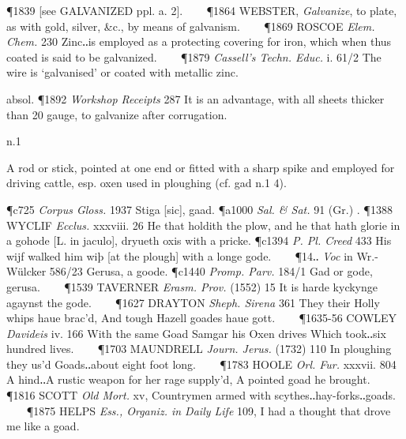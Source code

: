 \begin{description}[wide, labelwidth=!, labelindent=0pt]
\begin{myenumerate}
\P 1839 [see GALVANIZED ppl. a. 2].    
\P 1864 WEBSTER,  \textit{Galvanize}, to plate, as with gold, silver, \&c., by means of galvanism.    
\P 1869 ROSCOE  \textit{Elem. Chem.} 230 Zinc‥is employed as a protecting covering for iron, which when thus coated is said to be galvanized.    
\P 1879  \textit{Cassell's Techn. Educ.} i. 61/2 The wire is ‘galvanised’ or coated with metallic zinc.

\noindent absol. \P 1892 \textit{Workshop  Receipts} 287 It is an advantage, with all sheets thicker than 20 gauge, to galvanize after corrugation.
\end{myenumerate}


 n.1

\noindent {}

\vspace{-0.3cm}

\begin{myenumerate}

 A rod or stick, pointed at one end or fitted with a sharp spike and employed for driving cattle, esp. oxen used in ploughing (cf. gad n.1 4).

\P c725 \textit{Corpus Gloss.} 1937 Stiga  [sic], gaad.
\P a1000 \textit{Sal. \& Sat.}  91 (Gr.) .
\P 1388 WYCLIF  \textit{Ecclus.} xxxviii. 26 He that holdith the plow, and he that hath glorie in a gohode [L. in jaculo], dryueth oxis with a pricke.
\P c1394 \textit{P. Pl.  Creed} 433 His wijf walked him wiþ [at the plough] with a longe gode.    
\P 14‥ \textit{Voc} in Wr.-Wülcker 586/23 Gerusa, a goode.
\P c1440  \textit{Promp. Parv.} 184/1 Gad or gode, gerusa.    
\P 1539 TAVERNER  \textit{Erasm. Prov.} (1552) 15 It is harde kyckynge agaynst the gode.    
\P 1627 DRAYTON  \textit{Sheph. Sirena} 361 They their Holly whips haue brac'd, And tough Hazell goades haue gott.    
\P 1635-56 COWLEY  \textit{Davideis} iv. 166 With the same Goad Samgar his Oxen drives Which took‥six hundred lives.    
\P 1703 MAUNDRELL  \textit{Journ. Jerus.} (1732) 110 In ploughing they us'd Goads‥about eight foot long.    
\P 1783 HOOLE  \textit{Orl. Fur.} xxxvii. 804 A hind‥A rustic weapon for her rage supply'd, A pointed goad he brought.    
\P 1816 SCOTT  \textit{Old Mort.} xv, Countrymen armed with scythes‥hay-forks‥goads.    
\P 1875 HELPS  \textit{Ess., Organiz. in Daily Life} 109, I had a thought that drove me like a goad.


\end{myenumerate}
\end{description}
